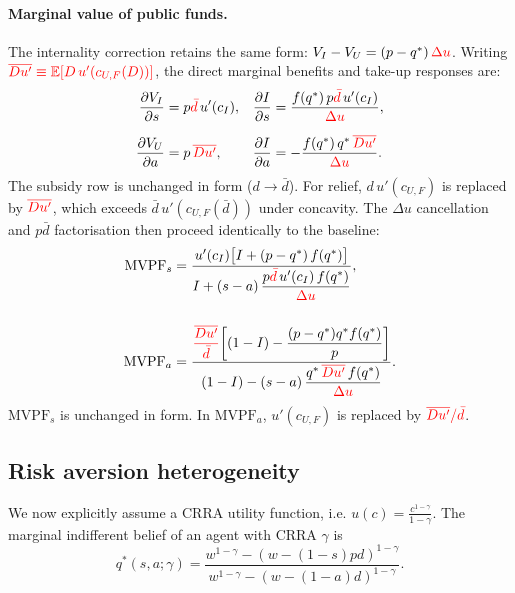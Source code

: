 \documentclass[12pt]{article}
\begin{document}
\paragraph{Marginal value of public funds.}
The internality correction retains the same form: $V_I-V_U=(p-q^*)\,\textcolor{red}{\Delta u}$. Writing $\textcolor{red}{\overline{Du'}\equiv\mathbb{E}[D\,u'(c_{U,F}(D))]}$, the direct marginal benefits and take-up responses are:
\begin{align}
    \frac{\partial V_I}{\partial s} &= p\textcolor{red}{\bar{d}}\,u'(c_I),
    &\frac{\partial I}{\partial s} &= \frac{f(q^*)\,p\textcolor{red}{\bar{d}}\,u'(c_I)}{\textcolor{red}{\Delta u}}, \label{eq:dI_s_cont}\\[6pt]
    \frac{\partial V_U}{\partial a} &= p\,\textcolor{red}{\overline{Du'}},
    &\frac{\partial I}{\partial a} &= -\frac{f(q^*)\,q^*\,\textcolor{red}{\overline{Du'}}}{\textcolor{red}{\Delta u}}. \label{eq:dI_a_cont}
\end{align}
The subsidy row is unchanged in form ($d\to\bar{d}$). For relief, $d\,u'(c_{U,F})$ is replaced by $\textcolor{red}{\overline{Du'}}$, which exceeds $\bar{d}\,u'(c_{U,F}(\bar{d}))$ under concavity. The $\Delta u$ cancellation and $p\bar{d}$ factorisation then proceed identically to the baseline:
\begin{align}
    \text{MVPF}_s &= \frac{u'(c_I)\bigl[I + (p-q^*)\,f(q^*)\bigr]}{I + (s-a)\,\dfrac{p\textcolor{red}{\bar{d}}\,u'(c_I)\,f(q^*)}{\textcolor{red}{\Delta u}}}, \label{eq:mvpf_s_cont}\\[14pt]
    \text{MVPF}_a &= \frac{\textcolor{red}{\dfrac{\overline{Du'}}{\bar{d}}}\!\left[(1-I) - \dfrac{(p-q^*)q^*f(q^*)}{p}\right]}{(1-I) - (s-a)\,\dfrac{q^*\,\textcolor{red}{\overline{Du'}}\,f(q^*)}{\textcolor{red}{\Delta u}}}. \label{eq:mvpf_a_cont}
\end{align}
$\mathrm{MVPF}_s$ is unchanged in form. In $\mathrm{MVPF}_a$, $u'(c_{U,F})$ is replaced by $\textcolor{red}{\overline{Du'}/\bar{d}}$.

\subsection{Risk aversion heterogeneity}

We now explicitly assume a CRRA utility function, i.e. $u(c)=\frac{c^{1-\gamma}}{1-\gamma}$. The marginal indifferent belief of an agent with CRRA $\gamma$ is 
\begin{equation}
    q^*(s,a;\gamma) = \frac{w^{1-\gamma} - (w-(1-s)pd)^{1-\gamma}}{w^{1-\gamma} - (w-(1-a)d)^{1-\gamma}}. \label{eq:qstargamma}
\end{equation}
\end{document}
